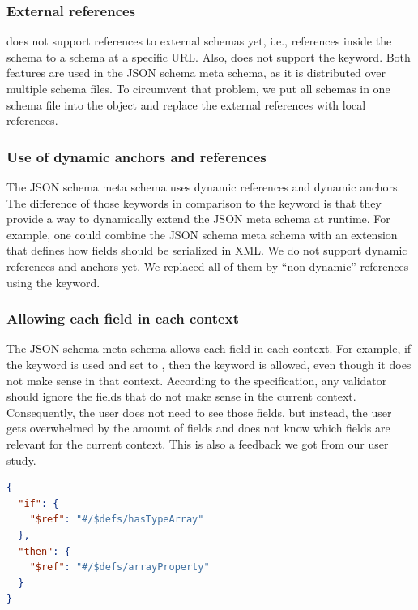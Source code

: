 \subsubsection{External references}
\toolname{} does not support references to external schemas yet, i.e., references inside the schema to a schema at a specific URL\@.
Also, \toolname{} does not support the  keyword.
Both features are used in the JSON schema meta schema, as it is distributed over multiple schema files.
To circumvent that problem, we put all schemas in one schema file into the  object and replace the external references with local references.

\subsubsection{Use of dynamic anchors and references}
The JSON schema meta schema uses dynamic references and dynamic anchors.
The difference of those keywords in comparison to the  keyword is that they provide a way to dynamically extend the JSON meta schema
at runtime.
For example, one could combine the JSON schema meta schema with an extension that defines how fields should be serialized in XML\@.
We do not support dynamic references and anchors yet.
We replaced all of them by ``non-dynamic'' references using the  keyword.

\subsubsection{Allowing each field in each context}
The JSON schema meta schema allows each field in each context.
For example, if the  keyword is used and set to , then the  keyword is allowed,
even though it does not make sense in that context.
According to the specification, any validator should ignore the fields that do not make sense in the current context.
Consequently, the user does not need to see those fields, but instead, the user gets overwhelmed by the amount of fields
and does not know which fields are relevant for the current context.
This is also a feedback we got from our user study.

\begin{lstlisting}[language=json, firstnumber=1, caption=
    {If condition for array properties. The \texttt{hasTypeArray} is valid if the current property is of type array. The \texttt{arrayProperty} schema defines the properties of an array.}, captionpos=b,label={lst:if-then-else}]
{
  "if": {
    "$ref": "#/$defs/hasTypeArray"
  },
  "then": {
    "$ref": "#/$defs/arrayProperty"
  }
}
\end{lstlisting}

